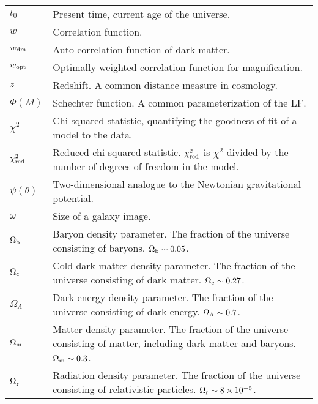 \begin{tabular}{p{0.6in}p{5.8in}}
$t_0$ & Present time, current age of the universe. \\
$w$ & Correlation function. \\
$w_{\rm dm}$ & Auto-correlation function of dark matter. \\
$w_{\rm opt}$ & Optimally-weighted correlation function for magnification. \\
$z$ & Redshift. A common distance measure in cosmology. \\
$\Phi(M)$ & Schechter function. A common parameterization of the \acs{LF}. \\
$\chi^2$ & Chi-squared statistic, quantifying the goodness-of-fit of a model to the data. \\
$\chi^2_{\rm red}$ & Reduced chi-squared statistic. $\chi^2_{\rm red}$ is $\chi^2$ divided by the number of degrees of freedom in the model. \\
$\psi(\theta)$ & Two-dimensional analogue to the Newtonian gravitational potential. \\
$\omega$ & Size of a galaxy image. \\
$\Omega_{\rm b}$ & Baryon density parameter. The fraction of the universe consisting of baryons. $\Omega_{\rm b} \sim 0.05$. \\
$\Omega_{\rm c}$ & Cold dark matter density parameter. The fraction of the universe consisting of dark matter. $\Omega_{\rm c} \sim 0.27$. \\
$\Omega_{\Lambda}$ & Dark energy density parameter. The fraction of the universe consisting of dark energy. $\Omega_{\rm \Lambda} \sim 0.7$. \\
$\Omega_{\rm m}$ & Matter density parameter. The fraction of the universe consisting of matter, including dark matter and baryons. $\Omega_{\rm m} \sim 0.3$. \\
$\Omega_{\rm r}$ & Radiation density parameter. The fraction of the universe consisting of relativistic particles. $\Omega_{\rm r} \sim 8 \times 10^{-5}$. \\

\end{tabular}



% 
